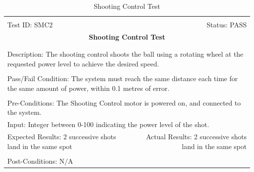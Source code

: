 \documentclass[11pt]{article}
\begin{document}
\begin{center}
\begin{table}[H]
\begin{tabular}{|l r|}\hline&\\[-2mm]
	Test ID: SMC2	&Status: PASS\\[-3mm]
	\multicolumn{2}{|c|}{\textbf{\large{Shooting Control Test}}}\\&\\\hline&\\[-3mm]
	\multicolumn{2}{|p{\textwidth}|}{Description: The shooting control shoots the ball using a rotating wheel at the requested power level to achieve the desired speed.}\\[1mm]\hline&\\[-3mm]
	\multicolumn{2}{|p{\textwidth}|}{Pass/Fail Condition: The system must reach the same distance each time for the same amount of power, within 0.1 metres of error.}\\[1mm]\hline&\\[-3mm]
	\multicolumn{2}{|p{\textwidth}|}{Pre-Conditions: The Shooting Control motor is powered on, and connected to the system.}\\[4mm]
	\multicolumn{2}{|p{\textwidth}|}{Input: Integer between 0-100 indicating the power level of the shot.
}\\[2mm]\hline
	\multicolumn{1}{|p{0.49\textwidth}}{Expected Results: 2 successive shots land in the same spot}	&\multicolumn{1}{|p{0.45\textwidth}|}{Actual Results: 2 successive shots land in the same spot}\\\hline&\\[-3mm]
	\multicolumn{2}{|p{\textwidth}|}{Post-Conditions: N/A}\\\hline
\end{tabular}
\caption{Shooting Control Test}
\end{table}
\end{center}
\end{document}
